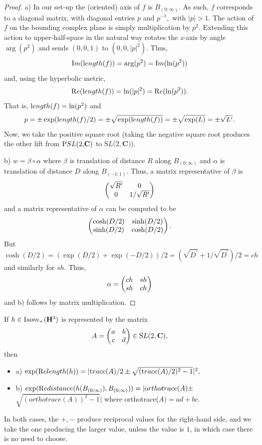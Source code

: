 \begin{proof}{}  a)  In our set-up  the (oriented) axis of $f$ is $B_{(0;\infty)}$.  
As such, $f$ corresponds to a diagonal matrix, with diagonal entries $p$ and $p^{-1},$  with $|p| >1.$ 
The action of $f$ on the bounding complex plane is simply multiplication by $p^2.$  Extending this action to upper-half-space in the natural way rotates the $z$-axis by angle $\arg(p^2)$ and sends $(0,0,1)$ to $(0,0,|p|^2).$ 
 Thus, $${\mathrm Im}({\textrm length}(f)) = \arg(p^2) = {\mathrm Im}(\ln(p^2))$$ and,
using the hyperbolic metric, 
$${\mathrm Re}({\textrm length}(f)) = \ln(|p|^2) = {\mathrm Re}(\ln(p^2)).$$
That is, ${\textrm length}(f) = \ln(p^2)$ and 
$$p = \pm \exp({\textrm length}(f)/2) = \pm \sqrt{\exp({\textrm length}(f))} = \pm \sqrt{\exp(L)} = \pm \sqrt{L^\prime}.$$ Now, we take the positive square
root (taking the negative square root produces the other lift from 
${\textrm PSL(2,}{\mathbf C})$ to ${\mathrm SL(2,}{\mathbf C})$).

b)  $w = \beta \circ \alpha$ where $\beta$ is translation of distance $R$ along $ B_{(0;\infty)}$ and $\alpha$ is translation of distance $D$ along $ B_{(-1;1)}$.  Thus,
	a matrix representative of $\beta$ is $$ \left(\begin{matrix}\sqrt{R^\prime} & 0 \cr 0 & 1/\sqrt{R^\prime}\cr\end{matrix}\right)$$ and a matrix representative of $\alpha$ can be computed to be $$\left(\begin{matrix}\cosh(D/2) & \sinh(D/2) \cr \sinh(D/2) & \cosh(D/2)\cr\end{matrix}\right).$$ But
$\cosh(D/2) = (\exp(D/2) + \exp(-D/2))/2 = 
(\sqrt{D^\prime} + 1/\sqrt{D^\prime})/2 = ch$ and similarly for $sh.$
Thus, $$\alpha = \left(\begin{matrix}ch & sh \cr sh & ch\cr\end{matrix}\right)$$ and b) follows by matrix multiplication.
\end{proof}

\begin{lemma}\label{GMT 1.25} If $h \in {\textrm Isom}_+({\mathbf H}^3)$ is represented by the matrix $$A = \left(\begin{matrix}a &  b \cr c & d\cr\end{matrix}\right)\in {\mathrm SL}(2,{\mathbf
C}),$$ then 
\begin{itemize}
\item{a)} $\exp({\textrm Relength} (h))= |{\textrm trace}(A)/2 \pm \sqrt{({\textrm trace}(A)/2)^2 - 1}|^2,$

\item{b)} $\exp({\textrm Redistance} (h(B_{(0;\infty)}), B_{(0;\infty)}))=|{\textrm orthotrace}(A) \pm$\hfill \noindent $\sqrt{({\mathrm
orthotrace}(A))^2 - 1}|$  where 
{\textrm orthotrace(}$A) = ad + bc.$ $\phantom{\sum^\int}$
\end{itemize}
In both cases{\textrm ,} the $+, -$ produce reciprocal values for the right\/{\textrm -}\/hand side{\textrm ,}
  and we take the one producing the larger value{\textrm ,} unless the value is $1${\textrm ,} in
which case there is no need to choose.
\end{lemma}

